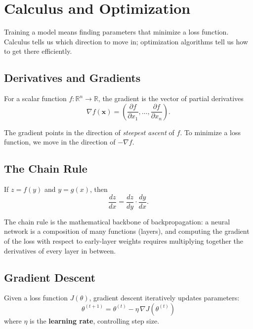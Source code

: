 \chapter{Calculus and Optimization}

Training a model means finding parameters that minimize a loss function.
Calculus tells us which direction to move in; optimization algorithms tell
us how to get there efficiently.

\section{Derivatives and Gradients}

\begin{definition}[Gradient]
For a scalar function $f:\mathbb{R}^n \to \mathbb{R}$, the gradient is the
vector of partial derivatives
\[
  \nabla f(\mathbf{x}) = \left(\frac{\partial f}{\partial x_1}, \ldots, \frac{\partial f}{\partial x_n}\right).
\]
\end{definition}

The gradient points in the direction of \emph{steepest ascent} of $f$. To
minimize a loss function, we move in the direction of $-\nabla f$.

\section{The Chain Rule}

\begin{definition}
If $z = f(y)$ and $y = g(x)$, then
\[
  \frac{dz}{dx} = \frac{dz}{dy}\cdot\frac{dy}{dx}.
\]
\end{definition}

The chain rule is the mathematical backbone of backpropagation: a neural
network is a composition of many functions (layers), and computing the
gradient of the loss with respect to early-layer weights requires
multiplying together the derivatives of every layer in between.

\section{Gradient Descent}

Given a loss function $J(\theta)$, gradient descent iteratively updates
parameters:
\[
  \theta^{(t+1)} = \theta^{(t)} - \eta\,\nabla J(\theta^{(t)})
\]
where $\eta$ is the \textbf{learning rate}, controlling step size.


